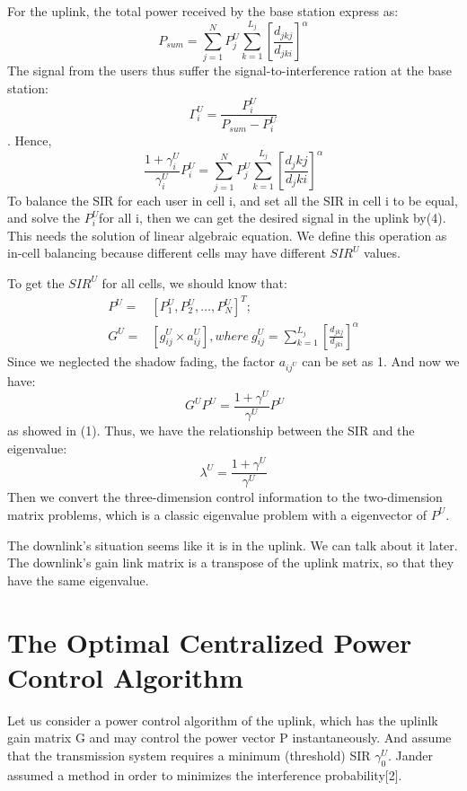 \documentclass[conference]{IEEEtran}
\begin{document}
For the uplink, the total power received by the base station express as:\begin{equation}
P_{sum} = \sum_{j=1}^N P_j^U \sum_{k=1}^{L_j} \left[ \frac{d_{jkj}}{d_{jki}}\right] ^{\alpha}
\end{equation}
The signal from the users thus suffer the signal-to-interference ration at the base station:
\begin{equation*}
\Gamma_i^U = \frac{P_i^U}{P_{sum}-P_i^U}
\end{equation*}.
Hence,
\begin{equation}
\frac{1+\gamma_i^U}{\gamma_i^U}P_i^U = \sum_{j=1}^N P_j^U \sum_{k=1}^{L_j} \left[\frac{d_jkj}{d_jki}\right] ^{\alpha}
\end{equation}
To balance the SIR for each user in cell i, and set all the SIR  in cell i to be equal, and solve the $P_i^U$for all i, then we can get the desired signal in the uplink by(4). This needs the solution of linear algebraic equation. We define this operation as in-cell balancing because different cells may have different $SIR^U$ values.

To get the $SIR^U$ for all cells, we should know that:
\begin{align}
P^U =& \left[ P^U_1, P^U_2,\dots,P^U_N \right]^T; \nonumber \\
G^U =& \left[ g^U_{ij}\times a_{ij}^U\right], where \ g^U_{ij} = \sum_{k=1}^{L_j} \left[ \frac{d_{jkj}}{d_{jki}}\right] ^{\alpha}
\end{align}
Since we neglected the shadow fading, the factor $a_{ij^U}$ can be set as 1. And now we have:
\begin{equation}
\ G^UP^U = \frac{1+\gamma^U}{\gamma^U}P^U
\end{equation}
as showed in (1).
Thus, we have the relationship between the SIR and the eigenvalue:
\begin{equation}
\lambda^U = \frac{1+\gamma^U}{\gamma^U}
\end{equation}
Then we convert the three-dimension control information to the two-dimension matrix problems, which is a classic eigenvalue problem with a eigenvector of $P^U$. 

The downlink's situation seems like it is in the uplink. We can talk about it later. The downlink's gain link matrix is a transpose of the uplink matrix, so that they have the same eigenvalue. 


\section{The Optimal Centralized Power Control Algorithm}
Let us consider a power control algorithm of the uplink, which has the uplinlk gain matrix G and may control the power vector P instantaneously. And assume that the transmission system requires a minimum (threshold) SIR $\gamma_0^U$. Jander assumed a method in order to minimizes the interference probability[2].
\end{document}
